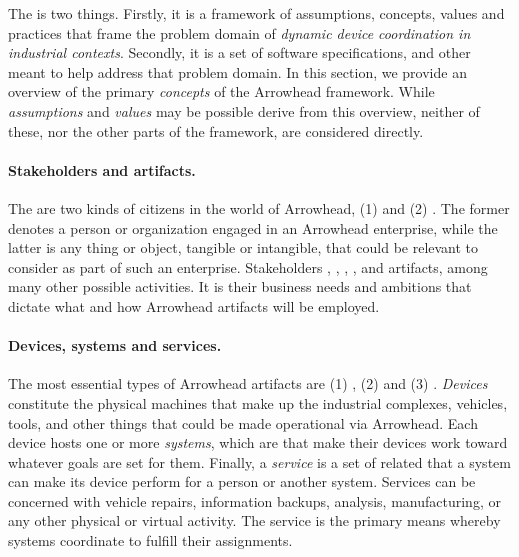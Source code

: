 %
%

The  is two things.
Firstly, it is a framework of assumptions, concepts, values and practices that frame the problem domain of \textit{dynamic device coordination in industrial contexts}.
Secondly, it is a set of software specifications,  and other  meant to help address that problem domain.
In this section, we provide an overview of the primary \textit{concepts} of the Arrowhead framework.
While \textit{assumptions} and \textit{values} may be possible derive from this overview, neither of these, nor the other parts of the framework, are considered directly.

\paragraph{Stakeholders and artifacts.}
The are two kinds of citizens in the world of Arrowhead, (1)  and (2) .
The former denotes a person or organization engaged in an Arrowhead enterprise, while the latter is any thing or object, tangible or intangible, that could be relevant to consider as part of such an enterprise.
Stakeholders , , , , and  artifacts, among many other possible activities.
It is their business needs and ambitions that dictate what and how Arrowhead artifacts will be employed.

\paragraph{Devices, systems and services.}
The most essential types of Arrowhead artifacts are (1) , (2)  and (3) .
\textit{Devices} constitute the physical machines that make up the industrial complexes, vehicles, tools, and other things that could be made operational via Arrowhead.
Each device hosts one or more \textit{systems}, which are   that make their devices work toward whatever goals are set for them.
Finally, a \textit{service} is a set of related  that a system can make its device perform for a person or another system.
Services can be concerned with vehicle repairs, information backups, analysis, manufacturing, or any other physical or virtual activity.
The service is the primary means whereby systems coordinate to fulfill their assignments.

